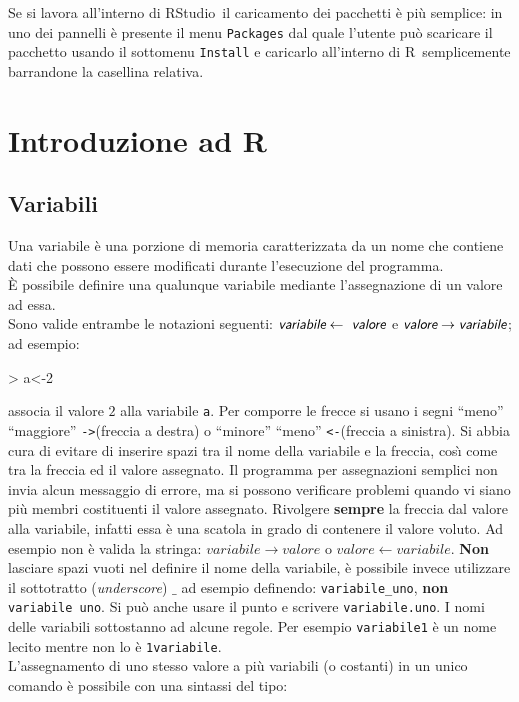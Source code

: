 \documentclass[onecolumn,11pt]{book}
\newcommand{\varia}[1]{\textsl{\textsf{#1}}}
\newcommand{\rst}{\textsf{RStudio}~}
\newcommand{\rpr}{\textsf{R}~}
\begin{document}
Se si lavora all'interno di \rst il caricamento dei pacchetti \`e pi\`u semplice: in uno dei pannelli \`e presente il menu \texttt{Packages} dal quale l'utente pu\`o scaricare il pacchetto usando il sottomenu \texttt{Install} e caricarlo all'interno di \rpr semplicemente barrandone la casellina relativa.

\chapter{Introduzione ad \rpr}

\section{Variabili}
Una variabile \`e una porzione di memoria caratterizzata da un nome che contiene dati che possono essere modificati durante l'esecuzione del programma.\\ \`E  possibile definire una qualunque variabile mediante l'assegnazione di un valore ad essa.\\
Sono valide entrambe le notazioni seguenti:
$ \varia{variabile}\leftarrow\varia{ valore}$ e
$\varia{valore} \to  \varia{variabile}$;
ad esempio:
\begin{Schunk}
\begin{Sinput}
> a<-2
\end{Sinput}
\end{Schunk}
associa il valore $2$ alla variabile \texttt{a}. Per comporre le frecce si usano i segni ``meno'' ``maggiore''  \texttt{->}(freccia a destra) o ``minore'' ``meno''  \texttt{<-}(freccia a sinistra).
Si abbia cura di evitare di inserire spazi tra il nome della variabile e la freccia, cos\`\i \; come tra la freccia ed il valore assegnato. Il programma per assegnazioni semplici non invia  alcun messaggio di errore, ma si possono verificare problemi quando vi siano pi\`u membri costituenti il valore assegnato.
Rivolgere {\bf sempre} la freccia dal valore alla variabile, infatti essa \`e una scatola in grado di contenere il valore voluto. Ad esempio non \`e valida la stringa:
$variabile\rightarrow valore $ o $ valore\leftarrow variabile$.
{\bf Non} lasciare spazi vuoti nel definire il nome della variabile, \`e possibile invece utilizzare  il sottotratto (\textit{underscore}) $\_$  ad esempio definendo: \texttt{variabile\_uno}, {\bf non} \texttt{variabile uno}. Si pu\`o anche usare il punto e scrivere  \texttt{variabile.uno}.
I nomi delle variabili sottostanno ad alcune regole. Per esempio \texttt{variabile1} \`e un nome lecito mentre non lo \`e  \texttt{1variabile}.\\  L'assegnamento di uno stesso valore a pi\`u variabili (o costanti) in un unico comando \`e possibile con una sintassi del tipo:
\end{document}

